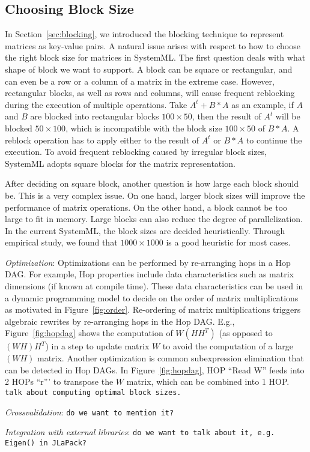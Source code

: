 \subsection{Choosing Block Size}

In Section~\ref{sec:blocking}, we introduced the blocking technique to represent matrices as key-value pairs. A natural issue arises with respect to how to choose the right block size for matrices in SystemML. The first question deals with what shape of block we want to support. A block can be square or rectangular, and can even be a row or a column of a matrix in the extreme case. However, rectangular blocks, as well as rows and columns, will cause frequent reblocking during the execution of multiple operations. Take $A^t+B*A$ as an example, if $A$ and $B$ are blocked into rectangular blocks $100\times 50$, then the result of $A^t$ will be blocked $50 \times 100$, which is incompatible with the block size $100\times 50$ of $B*A$. A reblock operation has to apply either to the result of $A^t$ or $B*A$ to continue the execution. To avoid frequent reblocking caused by irregular block sizes, SystemML adopts square blocks for the matrix representation.  


After deciding on square block, another question is how large each block should be. This is a very complex issue. On one hand, larger block sizes will improve the performance of matrix operations. On the other hand, a block cannot be too large to fit in memory. Large blocks can also reduce the degree of parallelization. In the current SystemML, the block sizes are decided heuristically. Through empirical study, we found that $1000\times 1000$ is a good heuristic for most cases.

{\it Optimization}: Optimizations can be performed by re-arranging hops in a Hop DAG. For example,
Hop properties include data characteristics such as matrix dimensions (if known at compile
time). These data characteristics can be used in a dynamic programming model to decide on the order
of matrix multiplications as motivated in Figure~\ref{fig:order}. Re-ordering of matrix
multiplications triggers algebraic rewrites by re-arranging hops in the Hop DAG. E.g.,
Figure~\ref{fig:hopdag} shows the computation of $W(HH^T)$ (as opposed to $(WH)H^T$) in a step to
update matrix $W$ to avoid the computation of a large $(WH)$ matrix. Another optimization is common
subexpression elimination that can be detected in Hop DAGs. In Figure~\ref{fig:hopdag}, HOP ``Read
W'' feeds into 2 HOPs ``r''' to transpose the $W$ matrix, which can be combined into 1 HOP. {\tt
  talk about computing optimal block sizes.}

{\it Crossvalidation}: {\tt do we want to mention it?}

{\it Integration with external libraries}: {\tt do we want to talk about it, e.g. Eigen() in JLaPack?}


